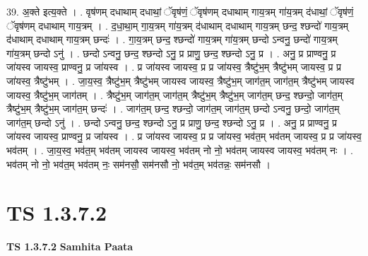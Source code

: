 \documentclass[17pt]{extarticle}
\begin{document}
39. अ॒क्ते इत्य॒क्ते । . वृष॑णम् दधाथाम् दधाथां॒ ॅवृष॑णं॒ ॅवृष॑णम् दधाथाम् गाय॒त्रम् गा॑य॒त्रम् द॑धाथां॒ ॅवृष॑णं॒ ॅवृष॑णम् दधाथाम् गाय॒त्रम् । . द॒धा॒था॒म् गा॒य॒त्रम् गा॑य॒त्रम् द॑धाथाम् दधाथाम् गाय॒त्रम् छन्द॒ श्छन्दो॑ गाय॒त्रम् द॑धाथाम् दधाथाम् गाय॒त्रम् छन्दः॑ । . गा॒य॒त्रम् छन्द॒ श्छन्दो॑ गाय॒त्रम् गा॑य॒त्रम् छन्दो ऽन्वनु॒ छन्दो॑ गाय॒त्रम् गा॑य॒त्रम् छन्दो ऽनु॑ । . छन्दो ऽन्वनु॒ छन्द॒ श्छन्दो ऽनु॒ प्र प्राणु॒ छन्द॒ श्छन्दो ऽनु॒ प्र । . अनु॒ प्र प्राण्वनु॒ प्र जा॑यस्व जायस्व॒ प्राण्वनु॒ प्र जा॑यस्व । . प्र जा॑यस्व जायस्व॒ प्र प्र जा॑यस्व॒ त्रैष्टु॑भ॒म् त्रैष्टु॑भम् जायस्व॒ प्र प्र जा॑यस्व॒ त्रैष्टु॑भम् । . जा॒य॒स्व॒ त्रैष्टु॑भ॒म् त्रैष्टु॑भम् जायस्व जायस्व॒ त्रैष्टु॑भ॒म् जाग॑त॒म् जाग॑त॒म् त्रैष्टु॑भम् जायस्व जायस्व॒ त्रैष्टु॑भ॒म् जाग॑तम् । . त्रैष्टु॑भ॒म् जाग॑त॒म् जाग॑त॒म् त्रैष्टु॑भ॒म् त्रैष्टु॑भ॒म् जाग॑त॒म् छन्द॒ श्छन्दो॒ जाग॑त॒म् त्रैष्टु॑भ॒म् त्रैष्टु॑भ॒म् जाग॑त॒म् छन्दः॑ । . जाग॑त॒म् छन्द॒ श्छन्दो॒ जाग॑त॒म् जाग॑त॒म् छन्दो ऽन्वनु॒ छन्दो॒ जाग॑त॒म् जाग॑त॒म् छन्दो ऽनु॑ । . छन्दो ऽन्वनु॒ छन्द॒ श्छन्दो ऽनु॒ प्र प्राणु॒ छन्द॒ श्छन्दो ऽनु॒ प्र । . अनु॒ प्र प्राण्वनु॒ प्र जा॑यस्व जायस्व॒ प्राण्वनु॒ प्र जा॑यस्व । . प्र जा॑यस्व जायस्व॒ प्र प्र जा॑यस्व॒ भव॑त॒म् भव॑तम् जायस्व॒ प्र प्र जा॑यस्व॒ भव॑तम् । . जा॒य॒स्व॒ भव॑त॒म् भव॑तम् जायस्व जायस्व॒ भव॑तम् नो नो॒ भव॑तम् जायस्व जायस्व॒ भव॑तम् नः । . भव॑तम् नो नो॒ भव॑त॒म् भव॑तम् नः॒ सम॑नसौ॒ सम॑नसौ नो॒ भव॑त॒म् भव॑तन्नः॒ सम॑नसौ । \newline
\pagebreak
{}
\section*{ TS 1.3.7.2 }

\textbf{TS 1.3.7.2 } \newline
\textbf{Samhita Paata} \newline
\end{document}
